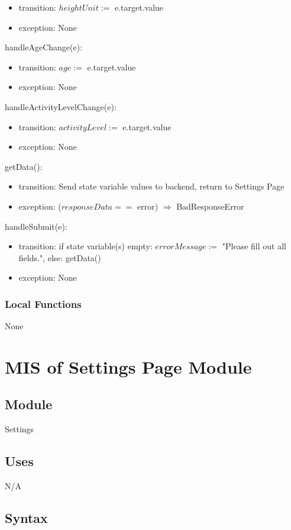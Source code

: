 \documentclass[12pt, titlepage]{article}
\begin{document}
\begin{itemize}
	\item transition: $heightUnit:=$ e.target.value
	\item exception: None
\end{itemize}
\noindent handleAgeChange(e):
\begin{itemize}
	\item transition: $age :=$ e.target.value
	\item exception: None
\end{itemize}
\noindent handleActivityLevelChange(e):
\begin{itemize}
	\item transition: $activityLevel :=$ e.target.value
	\item exception: None
\end{itemize}
\noindent getData():
\begin{itemize}
	\item transition: Send state variable values to backend, return to Settings 
	Page
	\item exception: ($responseData ==$ error) $\Rightarrow$ BadResponseError
\end{itemize}
\noindent handleSubmit(e):
\begin{itemize}
	\item transition: if state variable(s) empty: $errorMessage :=$ "Please 
	fill out all fields.", else: getData()
	\item exception: None
\end{itemize}

\subsubsection{Local Functions}
None

\newpage

\section{MIS of Settings Page Module}
\subsection{Module}
Settings
\subsection{Uses}
N/A
\subsection{Syntax}
\end{document}
